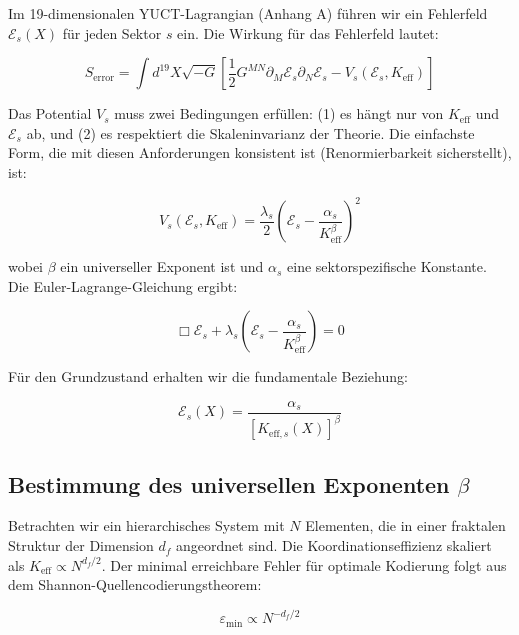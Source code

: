 \documentclass[12pt,a4paper]{article}
\theoremstyle{remark}
\newcommand{\Keff}{K_{\mathrm{eff}}}
\newcommand{\eps}{\varepsilon}
\newcommand{\df}{d_{\!f}}
\begin{document}
	Im 19-dimensionalen YUCT-Lagrangian (Anhang A) führen wir ein Fehlerfeld $\mathcal{E}_s(X)$ für jeden Sektor $s$ ein. Die Wirkung für das Fehlerfeld lautet:
	
	\begin{equation}
		S_{\text{error}} = \int d^{19}X \sqrt{-G} \left[ \frac{1}{2} G^{MN} \partial_M \mathcal{E}_s \partial_N \mathcal{E}_s - V_s(\mathcal{E}_s, \Keff) \right]
		\label{eq:error-action}
	\end{equation}
	
	Das Potential $V_s$ muss zwei Bedingungen erfüllen: (1) es hängt nur von $\Keff$ und $\mathcal{E}_s$ ab, und (2) es respektiert die Skaleninvarianz der Theorie. Die einfachste Form, die mit diesen Anforderungen konsistent ist (Renormierbarkeit sicherstellt), ist:
	
	\begin{equation}
		V_s(\mathcal{E}_s, \Keff) = \frac{\lambda_s}{2} \left( \mathcal{E}_s - \frac{\alpha_s}{\Keff^{\beta}} \right)^2
		\label{eq:error-potential}
	\end{equation}
	
	wobei $\beta$ ein universeller Exponent ist und $\alpha_s$ eine sektorspezifische Konstante. Die Euler-Lagrange-Gleichung ergibt:
	
	\begin{equation}
		\Box \mathcal{E}_s + \lambda_s \left( \mathcal{E}_s - \frac{\alpha_s}{\Keff^{\beta}} \right) = 0
		\label{eq:error-eom}
	\end{equation}
	
	Für den Grundzustand erhalten wir die fundamentale Beziehung:
	
	\begin{equation}
		\mathcal{E}_s(X) = \frac{\alpha_s}{[K_{\mathrm{eff},s}(X)]^{\beta}}
		\label{eq:error-ground}
	\end{equation}
	
	\subsection{Bestimmung des universellen Exponenten $\beta$}
	
	Betrachten wir ein hierarchisches System mit $N$ Elementen, die in einer fraktalen Struktur der Dimension $\df$ angeordnet sind. Die Koordinationseffizienz skaliert als $\Keff \propto N^{\df/2}$. Der minimal erreichbare Fehler für optimale Kodierung folgt aus dem Shannon-Quellencodierungstheorem:
	
	\begin{equation}
		\eps_{\min} \propto N^{-\df/2}
		\label{eq:shannon-bound}
	\end{equation}
	
\end{document}
